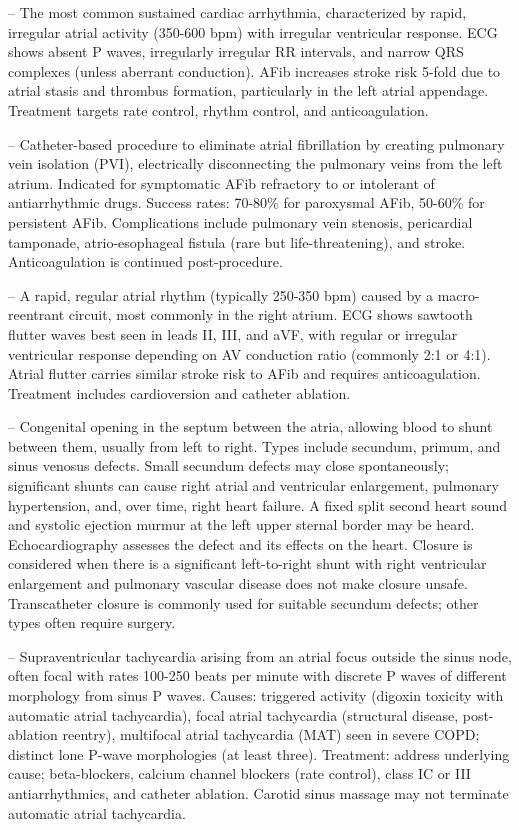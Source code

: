 -- The most common sustained cardiac arrhythmia, characterized by rapid, irregular atrial activity (350-600 bpm) with irregular ventricular response. ECG shows absent P waves, irregularly irregular RR intervals, and narrow QRS complexes (unless aberrant conduction). AFib increases stroke risk 5-fold due to atrial stasis and thrombus formation, particularly in the left atrial appendage. Treatment targets rate control, rhythm control, and anticoagulation.

-- Catheter-based procedure to eliminate atrial fibrillation by creating pulmonary vein isolation (PVI), electrically disconnecting the pulmonary veins from the left atrium. Indicated for symptomatic AFib refractory to or intolerant of antiarrhythmic drugs. Success rates: 70-80\% for paroxysmal AFib, 50-60\% for persistent AFib. Complications include pulmonary vein stenosis, pericardial tamponade, atrio-esophageal fistula (rare but life-threatening), and stroke. Anticoagulation is continued post-procedure.

-- A rapid, regular atrial rhythm (typically 250-350 bpm) caused by a macro-reentrant circuit, most commonly in the right atrium. ECG shows sawtooth flutter waves best seen in leads II, III, and aVF, with regular or irregular ventricular response depending on AV conduction ratio (commonly 2:1 or 4:1). Atrial flutter carries similar stroke risk to AFib and requires anticoagulation. Treatment includes cardioversion and catheter ablation.

-- Congenital opening in the septum between the atria, allowing blood to shunt between them, usually from left to right. Types include secundum, primum, and sinus venosus defects. Small secundum defects may close spontaneously; significant shunts can cause right atrial and ventricular enlargement, pulmonary hypertension, and, over time, right heart failure. A fixed split second heart sound and systolic ejection murmur at the left upper sternal border may be heard. Echocardiography assesses the defect and its effects on the heart. Closure is considered when there is a significant left-to-right shunt with right ventricular enlargement and pulmonary vascular disease does not make closure unsafe. Transcatheter closure is commonly used for suitable secundum defects; other types often require surgery.

-- Supraventricular tachycardia arising from an atrial focus outside the sinus node, often focal with rates 100-250 beats per minute with discrete P waves of different morphology from sinus P waves. Causes: triggered activity (digoxin toxicity with automatic atrial tachycardia), focal atrial tachycardia (structural disease, post-ablation reentry), multifocal atrial tachycardia (MAT) seen in severe COPD; distinct lone P-wave morphologies (at least three). Treatment: address underlying cause; beta-blockers, calcium channel blockers (rate control), class IC or III antiarrhythmics, and catheter ablation. Carotid sinus massage may not terminate automatic atrial tachycardia.

